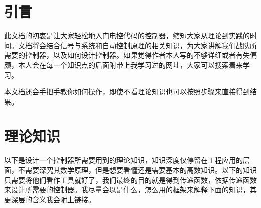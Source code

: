 \documentclass[UTF8,a4paper,12pt]{ctexart}
\begin{document}
  \begin{center}
    \tableofcontents
  \end{center}
  \newpage

  \section{引言}
  \begin{flushleft}
    \hspace{2em}此文档的初衷是让大家轻松地入门电控代码的控制器，缩短大家从理论到实践的时间。文档将会结合信号与系统和自动控制原理的相关知识，为大家讲解我们战队所需要的控制器，以及如何设计控制器。如果觉得作者本人写的不够详细或者有失偏颇，本人会在每一个知识点的后面附带上我学习过的网址，大家可以搜索着来学习。
    \par\hspace{2em}本文档还会手把手教你如何操作，即使不看理论知识也可以按照步骤来直接得到结果。


  \end{flushleft}
  \section{理论知识}

  \begin{flushleft}
    以下是设计一个控制器所需要用到的理论知识，知识深度仅停留在工程应用的层面，不需要深究其数学原理，但是想要看懂还是需要基本的高数知识。以下的知识只需要将他们看作工具就好了，我们最终的目的就是得到传递函数，依据传递函数来设计所需要的控制器。我尽量会以是什么，怎么用的框架来解释下面的知识，其更深层的含义我会附上链接。
  \end{flushleft}
\end{document}
